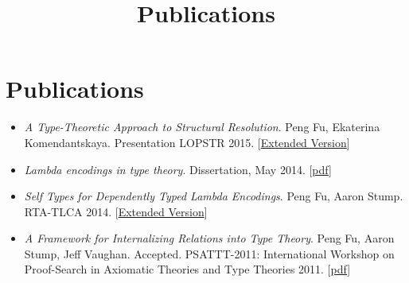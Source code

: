 \documentclass[10pt]{article}
\title{\bfseries\Large Publications}
\date{}
\begin{document}
\maketitle
\vspace{-4em}

\vspace{20pt}





\section*{Publications}

\begin{itemize}
\item \textit{A Type-Theoretic Approach to Structural Resolution}. Peng Fu, Ekaterina Komendantskaya. Presentation LOPSTR 2015. [\href{../../document/papers/tm-lp.pdf}{Extended Version}]

\item \textit{Lambda encodings in type theory}. Dissertation, May 2014. [\href{../../document/papers/dissertation.pdf}{pdf}]

\item \textit{Self Types for Dependently Typed Lambda Encodings}. Peng Fu, Aaron Stump. RTA-TLCA 2014. [\href{../../document/papers/rta-tlca.pdf}{Extended Version}]

\item \textit{A Framework for Internalizing Relations into Type Theory}. Peng Fu, Aaron Stump, Jeff Vaughan. Accepted. PSATTT-2011: International Workshop on Proof-Search in Axiomatic Theories and Type Theories 2011. [\href{../../document/papers/psattt-paper.pdf}{pdf}]
  
\end{itemize}
\end{document}
